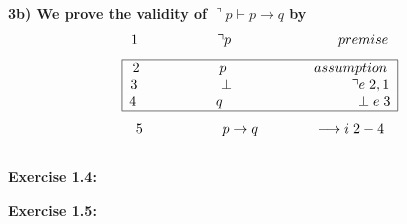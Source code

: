 \documentclass[a4paper]{article}
\begin{document}
\newpage

\textbf{{\large\hspace{1 cm} 3b) We prove the validity of $\urcorner p \vdash p \rightarrow q$ by}}
{\large $$1 \hspace{2 cm} \urcorner p \hspace{2.7 cm} premise$$ 
$$\begin{array}{|c|}
\hline 
\textcolor{black}{2 \hspace{2 cm} p \hspace{2.2 cm} assumption}\\

\textcolor{black}{3 \hspace{2 cm} \perp \hspace{3 cm} \urcorner e \hspace{0.1 cm} 2,1}\\

\textcolor{black}{4 \hspace{2 cm} q \hspace{3.3 cm} \perp e \hspace{0.1 cm} 3}\\
\hline
\end{array}$$ $$5 \hspace{2 cm} p \rightarrow q \hspace{1.4 cm} \longrightarrow i \hspace{0.1 cm} 2-4$$}\\

\textbf{\large\hspace{0.5cm} Exercise 1.4:}

\textbf{\large\hspace{0.5cm} Exercise 1.5:}
\end{document}
